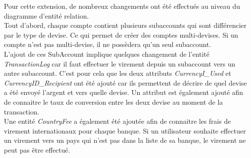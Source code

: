 Pour cette extension, de nombreux changements ont été effectués au niveau du diagramme d'entité relation.\\
Tout d'abord, chaque compte contient plusieurs subaccounts qui sont différencier par le type de devise. Ce qui permet de créer des comptes multi-devises. 
Si un compte n'est pas multi-devise, il ne possèdera qu'un seul subaccount.\\
L'ajout de ces SubAccount implique quelques changement de l'entité \emph{TransactionLog} car il faut effectuer le virement depuis un subaccount vers un autre subaccount.
C'est pour cela que les deux attributs \textit{CurrencyI\_Used} et \textit{CurrencyID\_Recipient} ont été ajouté car ils permettent de décrire de quel devise a été envoyé l'argent et vers quelle devise.
Un attribut est également ajouté afin de connaitre le taux de conversion entre les deux devise au moment de la transaction.\\
Une entité \emph{CountryFee} a également été ajoutée afin de connaitre les frais de virement internationaux pour chaque banque. 
Si un utilisateur souhaite effectuer un virement vers un pays qui n'est pas dans la liste de sa banque, le virement ne peut pas être effectué.